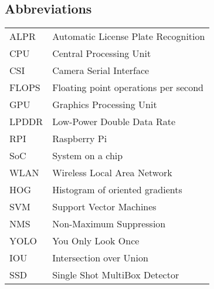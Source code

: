 \subsection{Abbreviations}
\begin{tabularx}{\textwidth}{lX}
    ALPR  & Automatic License Plate Recognition\\
    CPU   & Central Processing Unit\\
    CSI   & Camera Serial Interface\\
    FLOPS & Floating point operations per second\\
    GPU   & Graphics Processing Unit\\
    LPDDR & Low-Power Double Data Rate\\
    RPI   & Raspberry Pi\\
    SoC   & System on a chip\\
    WLAN  & Wireless Local Area Network\\
    HOG   & Histogram of oriented gradients\\
    SVM   & Support Vector Machines\\
    NMS   & Non-Maximum Suppression\\
    YOLO  & You Only Look Once\\
    IOU   & Intersection over Union\\
    SSD   & Single Shot MultiBox Detector\\
\end{tabularx}
